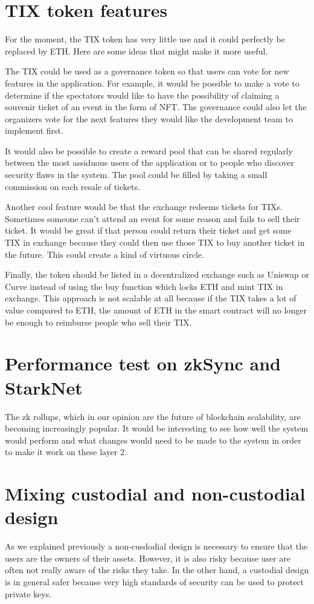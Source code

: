 \documentclass[a4paper,11pt,oneside]{report}
\begin{document}
\section{TIX token features}
For the moment, the TIX token has very little use and it could perfectly be replaced by ETH. Here are some ideas that might make it more useful.

The TIX could be used as a governance token so that users can vote for new features in the application. For example, it would be possible to make a vote to determine if the spectators would like to have the possibility of claiming a souvenir ticket of an event in the form of NFT. The governance could also let the organizers vote for the next features they would like the development team to implement first.

It would also be possible to create a reward pool that can be shared regularly between the most assiduous users of the application or to people who discover security flaws in the system. The pool could be filled by taking a small commission on each resale of tickets.

Another cool feature would be that the exchange redeems tickets for TIXs. Sometimes someone can't attend an event for some reason and fails to sell their ticket. It would be great if that person could return their ticket and get some TIX in exchange because they could then use those TIX to buy another ticket in the future. This could create a kind of virtuous circle.

Finally, the token should be listed in a decentralized exchange such as Uniswap or Curve instead of using the buy function which locks ETH and mint TIX in exchange. This approach is not scalable at all because if the TIX takes a lot of value compared to ETH, the amount of ETH in the smart contract will no longer be enough to reimburse people who sell their TIX.

\section{Performance test on zkSync and StarkNet}
The zk rollups, which in our opinion are the future of blockchain scalability, are becoming increasingly popular. It would be interesting to see how well the system would perform and what changes would need to be made to the system in order to make it work on these layer 2.

\section{Mixing custodial and non-custodial design}
As we explained previously a non-cusdodial design is necessary to ensure that the users are the owners of their assets. However, it is also risky because user are often not really aware of the risks they take. In the other hand, a custodial design is in general safer because very high standards of security can be used to protect private keys.
\end{document}
